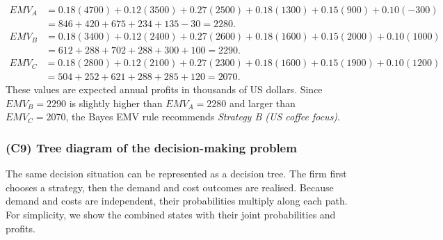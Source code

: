 	\[
	\begin{aligned}
		EMV_A &= 0.18(4700)+0.12(3500)+0.27(2500)+0.18(1300)+0.15(900)+0.10(-300)\\
		&= 846+420+675+234+135-30=2280.
	\end{aligned}
	\]
	\[
	\begin{aligned}
		EMV_B &= 0.18(3400)+0.12(2400)+0.27(2600)+0.18(1600)+0.15(2000)+0.10(1000)\\
		&= 612+288+702+288+300+100=2290.
	\end{aligned}
	\]
	\[
	\begin{aligned}
		EMV_C &= 0.18(2800)+0.12(2100)+0.27(2300)+0.18(1600)+0.15(1900)+0.10(1200)\\
		&= 504+252+621+288+285+120=2070.
	\end{aligned}
	\]
	These values are expected annual profits in thousands of US dollars. Since \(EMV_B=2290\) is slightly higher than \(EMV_A=2280\) and larger than \(EMV_C=2070\), the Bayes EMV rule recommends \emph{Strategy B (US coffee focus)}.
	
	\subsubsection{(C9) Tree diagram of the decision-making problem}\label{subsubsec:example2-c9}
	
	The same decision situation can be represented as a decision tree. The firm first chooses a strategy, then the
	demand and cost outcomes are realised. Because demand and costs are independent, their probabilities multiply along
	each path. For simplicity, we show the combined states with their joint probabilities and profits.
	
